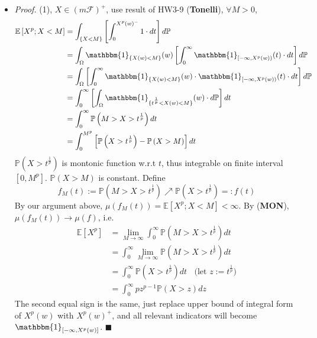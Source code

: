 \documentclass[a4paper,12pt,twoside]{book}
\begin{document}
\begin{itemize}
	\item[]\textit{Proof.} (1), $X\in(m \mathcal{F})^+$, use result of HW3-9 (\textbf{Tonelli}), $\forall M>0$,
	\begin{equation}
		\begin{split}
			\mathbb{E}\left[X^p;X<M\right]
			&=\int_{\{X<M\}}\left[\int_0^{X^p(w)^-}1\cdot dt\right]d\mathbb{P}\\
			&=\int_{\Omega}\mathbbm{1}_{\{X(w)<M\}}(w)\left[\int_0^{\infty}\mathbbm{1}_{[-\infty, X^p(w))}(t)\cdot dt\right]d\mathbb{P}\\
			&=\int_{\Omega}\left[\int_0^{\infty}\mathbbm{1}_{\{X(w)<M\}}(w)\cdot\mathbbm{1}_{[-\infty, X^p(w))}(t)\cdot dt\right]d\mathbb{P}\\
			&=\int_0^{\infty}\left[\int_{\Omega}\mathbbm{1}_{\{t^{\frac{1}{p}}<X(w)<M\}}(w)\cdot d \mathbb{P}\right]dt\\
			&=\int_0^{\infty} \mathbb{P}\left(M>X>t^{\frac{1}{p}}\right)dt\\
			&=\int_0^{M^p} \left[\mathbb{P}\left(X>t^{\frac{1}{p}}\right)-\mathbb{P}\left(X>M\right)\right]dt
		\end{split}
	\end{equation}
	$\mathbb{P}\left(X>t^{\frac{1}{p}}\right)$ is montonic function w.r.t $t$, thus integrable on finite interval $[0, M^p]$. $\mathbb{P}\left(X>M\right)$ is constant. Define
	\begin{equation}
		f_M(t):=\mathbb{P}\left(M>X>t^{\frac{1}{p}}\right)\nearrow \mathbb{P}\left(X>t^{\frac{1}{p}}\right)=:f(t)
	\end{equation}
	By our argument above, $\mu(f_M(t))=\mathbb{E}\left[X^p;X<M\right]<\infty$. By (\textbf{MON}), $\mu(f_M(t))\to \mu(f)$, i.e.
	\begin{equation}
		\begin{split}
			\mathbb{E}\left[X^p\right]&=\lim\limits_{M\rightarrow\infty}\int_0^{\infty} \mathbb{P}\left(M>X>t^{\frac{1}{p}}\right)dt\\
			&=\int_0^{\infty} \lim\limits_{M\rightarrow\infty}\mathbb{P}\left(M>X>t^{\frac{1}{p}}\right)dt\\
			&=\int_0^{\infty}\mathbb{P}\left(X>t^{\frac{1}{p}}\right)dt~~~~\text{(let $z:=t^{\frac{1}{p}}$)}\\
			&=\int_0^{\infty}pz^{p-1}\mathbb{P}\left(X>z\right)dz
		\end{split}
	\end{equation}
	The second equal sign is the same, just replace upper bound of integral form of $X^p(w)$ with $X^p(w)^+$, and all relevant indicators will become $\mathbbm{1}_{[-\infty,X^p(w)]}$. $\blacksquare$


\end{itemize}
\end{document}
